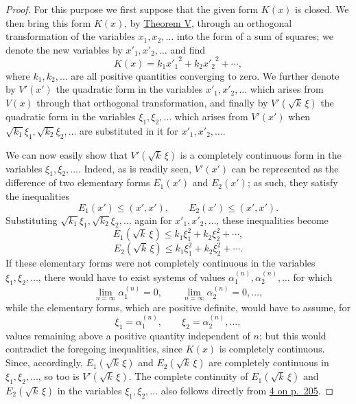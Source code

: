 \documentclass[b5paper,twoside]{article}
\newcommand{\originalpage}[1]{\phantomsection\label{origpage:#1}}
\begin{document}
\begin{proof}
For this purpose we first suppose that the given form $K(x)$ is closed. We
then bring this form $K(x)$, by \hyperref[thm:V]{Theorem V}, through an
orthogonal transformation of the variables $x_1,x_2,\ldots$ into the form
of a sum of squares; we denote the new variables by $x'_1,x'_2,\ldots$ and
find
\[
  K(x)=k_1{x'_1}^{2}+k_2{x'_2}^{2}+\cdots,
\]
where $k_1,k_2,\ldots$ are all positive quantities converging to zero. We
further denote by $V'(x')$ the quadratic form in the variables
$x'_1,x'_2,\ldots$ which arises from $V(x)$ through that orthogonal
transformation, and finally by $V'(\sqrt{k}\,\xi)$ the quadratic form in the
variables $\xi_1,\xi_2,\ldots$ which arises from $V'(x')$ when
$\sqrt{k_1}\xi_1,\sqrt{k_2}\xi_2,\ldots$ are substituted in it for
$x'_1,x'_2,\ldots$.

We can now easily show that $V'(\sqrt{k}\,\xi)$ is a completely continuous
form in the variables $\xi_1,\xi_2,\ldots$. Indeed, as is readily seen,
$V'(x')$ can be represented as the difference of two elementary forms
$E_1(x')$ and $E_2(x')$; as such, they satisfy the inequalities
\[
  E_1(x')\leq(x',x'),\qquad E_2(x')\leq(x',x').
\]
Substituting $\sqrt{k_1}\xi_1,\sqrt{k_2}\xi_2,\ldots$ again for
$x'_1,x'_2,\ldots$, these inequalities become
\[
  E_1(\sqrt{k}\,\xi)\leq k_1\xi_1^2+k_2\xi_2^2+\cdots,
\]
\[
  E_2(\sqrt{k}\,\xi)\leq k_1\xi_1^2+k_2\xi_2^2+\cdots.
\]
If these elementary forms were not completely continuous in the variables
$\xi_1,\xi_2,\ldots$, there would have to exist systems of values
$\alpha_1^{(n)},\alpha_2^{(n)},\ldots$ for which
\[
  \lim_{n=\infty}\alpha_1^{(n)}=0,\qquad
  \lim_{n=\infty}\alpha_2^{(n)}=0,\ldots,
\]
while the elementary forms, which are positive definite, would have to
assume, for
\[
  \xi_1=\alpha_1^{(n)},\qquad \xi_2=\alpha_2^{(n)},\ldots,
\]
values remaining above a positive quantity independent of $n$;
\originalpage{211}
but this would contradict the foregoing inequalities, since $K(x)$ is
completely continuous. Since, accordingly,
$E_1(\sqrt{k}\,\xi)$ and $E_2(\sqrt{k}\,\xi)$ are completely continuous in
$\xi_1,\xi_2,\ldots$, so too is $V'(\sqrt{k}\,\xi)$. The complete continuity
of $E_1(\sqrt{k}\,\xi)$ and $E_2(\sqrt{k}\,\xi)$ in the variables
$\xi_1,\xi_2,\ldots$ also follows directly from
\hyperref[origpage:205]{4 on p.~205}.


\end{proof}
\end{document}
